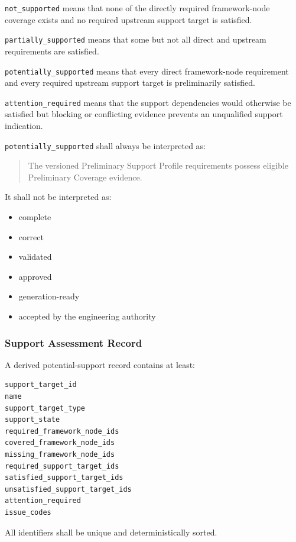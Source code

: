 \texttt{not\_supported} means that none of the directly required framework-node coverage exists and no required upstream support target is satisfied.

\texttt{partially\_supported} means that some but not all direct and upstream requirements are satisfied.

\texttt{potentially\_supported} means that every direct framework-node requirement and every required upstream support target is preliminarily satisfied.

\texttt{attention\_required} means that the support dependencies would otherwise be satisfied but blocking or conflicting evidence prevents an unqualified support indication.

\texttt{potentially\_supported} shall always be interpreted as:

\begin{quote}
The versioned Preliminary Support Profile requirements possess eligible Preliminary Coverage evidence.
\end{quote}

It shall not be interpreted as:

\begin{itemize}
\tightlist
\item
  complete
\item
  correct
\item
  validated
\item
  approved
\item
  generation-ready
\item
  accepted by the engineering authority
\end{itemize}

\hypertarget{support-assessment-record}{%
\subsubsection{Support Assessment Record}\label{support-assessment-record}}

A derived potential-support record contains at least:

\begin{verbatim}
support_target_id
name
support_target_type
support_state
required_framework_node_ids
covered_framework_node_ids
missing_framework_node_ids
required_support_target_ids
satisfied_support_target_ids
unsatisfied_support_target_ids
attention_required
issue_codes
\end{verbatim}

All identifiers shall be unique and deterministically sorted.


